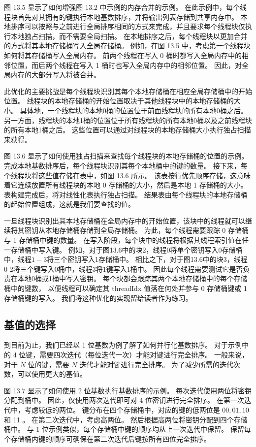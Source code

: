图 13.5 显示了如何增强图 13.2 中示例的内存合并的示例。 
在此示例中，每个线程块首先对其拥有的键执行本地基数排序，并将输出列表存储到共享内存中。 
本地排序可以按照与之前进行全局排序相同的方式来完成，并且要求每个线程块仅执行本地独占扫描，而不需要全局扫描。 
在本地排序之后，每个线程块以更加合并的方式将其本地存储桶写入全局存储桶。 
例如，在图 13.5 中，考虑第一个线程块如何将其存储桶写入全局内存。 
前两个线程在写入 0 桶时都写入全局内存中的相邻位置，而后两个线程在写入 1 桶时也写入全局内存中的相邻位置。 
因此，对全局内存的大部分写入将被合并。

此优化的主要挑战是每个线程块识别其每个本地存储桶在相应全局存储桶中的开始位置。 
线程块的本地存储桶的开始位置取决于其他线程块中的本地存储桶的大小。 
具体地，一个线程块的本地0桶的位置位于前面线程块的所有本地0桶之后。 
另一方面，线程块的本地1桶的位置位于所有线程块的所有本地0桶以及之前线程块的所有本地1桶之后。 
这些位置可以通过对线程块的本地存储桶大小执行独占扫描来获得。

图 13.6 显示了如何使用独占扫描来查找每个线程块的本地存储桶的位置的示例。 
完成本地基数排序后，每个线程块识别其每个本地桶中的键的数量。 接下来，每个线程块将这些值存储在表中，如图 13.6 所示。 
该表按行优先顺序存储，这意味着它连续放置所有线程块的本地 0 存储桶的大小，然后是本地 1 存储桶的大小。 
表构建完成后，将对线性化表执行独占扫描。 结果表由每个线程块的本地存储桶的起始位置组成，这就是我们要查找的值。

一旦线程块识别出其本地存储桶在全局内存中的开始位置，该块中的线程就可以继续将其密钥从本地存储桶存储到全局存储桶。 
为此，每个线程需要跟踪 0 存储桶与 1 存储桶中键的数量。 在写入阶段，每个块中的线程将根据其线程索引值在任一存储桶中写入键。 
例如，对于图13.6中的块2，线程0将单个密钥写入0存储桶中，线程$1-3$将三个密钥写入1存储桶中。 
相比之下，对于图13.6中的块3，线程0-2将三个键写入0桶中，线程3将1键写入1桶中。 
因此每个线程需要测试它是否负责在本地0桶或1桶中写入密钥。 
每个块都会跟踪其两个本地存储桶中的每个存储桶中的键数，
以便线程可以确定其 threadIdx 值落在何处并参与 0 存储桶键或 1 存储桶键的写入。 我们将这种优化的实现留给读者作为练习。

\subsection{基值的选择}
到目前为止，我们已经以 1 位基数为例了解了如何并行化基数排序。 
对于示例中的 4 位键，需要四次迭代（每位迭代一次）才能对键进行完全排序。 
一般来说，对于 $N$ 位的键，需要 $N$ 迭代才能对键进行完全排序。 为了减少所需的迭代次数，可以使用更大的基值。

图 13.7 显示了如何使用 2 位基数执行基数排序的示例。 每次迭代使用两位将密钥分配到桶中。 
因此，仅使用两次迭代即可对 4 位密钥进行完全排序。 在第一次迭代中，考虑较低的两位。 
键分布在四个存储桶中，对应的键的低两位是 $00,01,10$ 和 11 。 在第二次迭代中，考虑高两位。 
然后根据高两位将密钥分配到四个存储桶中。 与 1 位示例类似，每个存储桶中键的顺序均从上一次迭代中保留。 
保留每个存储桶内键的顺序可确保在第二次迭代后键按所有四位完全排序。

